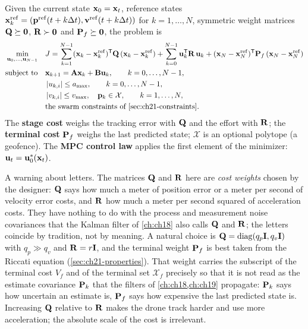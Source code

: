 \begin{definition}
\label{def:ch21-ocp}
Given the current state $\mathbf{x}_0=\mathbf{x}_t$, reference states
$\mathbf{x}_k^{\mathrm{ref}}=(\mathbf{p}^{\mathrm{ref}}(t+k\Delta t),\mathbf{v}^{\mathrm{ref}}(t+k\Delta t))$
for $k=1,\dots,N$, symmetric weight matrices $\mathbf{Q}\succeq\mathbf{0}$,
$\mathbf{R}\succ\mathbf{0}$ and $\mathbf{P}_f\succeq\mathbf{0}$, the problem is
\begin{equation}
\begin{aligned}
\min_{\ctrl_0,\dots,\ctrl_{N-1}}\quad & J=\sum_{k=1}^{N-1}(\state_k-\state_k^{\mathrm{ref}})\T\mat{Q}\,(\state_k-\state_k^{\mathrm{ref}})
+\sum_{k=0}^{N-1}\ctrl_k\T\mat{R}\,\ctrl_k
+(\state_N-\state_N^{\mathrm{ref}})\T\mat{P}_f\,(\state_N-\state_N^{\mathrm{ref}})\\
\st & \state_{k+1}=\mat{A}\state_k+\mat{B}\ctrl_k,\qquad k=0,\dots,N-1,\\
& \abs{u_{k,i}}\le a_{\max},\qquad k=0,\dots,N-1,\\
& \abs{v_{k,i}}\le v_{\max},\quad \pos_k\in\mathcal{X},\qquad k=1,\dots,N,\\
& \text{the swarm constraints of \cref{sec:ch21-constraints}.}
\end{aligned}
\label{eq:ch21-ocp}
\end{equation}
The \textbf{stage cost} weighs the tracking error with
$\mathbf{Q}$ and the effort with $\mathbf{R}$; the \textbf{terminal
cost} $\mathbf{P}_f$ weighs the last predicted state;
$\mathcal{X}$ is an optional polytope (a geofence). The \textbf{MPC control
law} applies the first element
of the minimizer: $\mathbf{u}_t=\mathbf{u}_0^{*}(\mathbf{x}_t)$.
\end{definition}

A warning about letters. The matrices $\mathbf{Q}$ and $\mathbf{R}$ here are
\emph{cost weights} chosen by the designer: $\mathbf{Q}$ says how much a meter
of position error or a meter per second of velocity error costs, and
$\mathbf{R}$ how much a meter per second squared of acceleration costs. They
have nothing to do with the process and measurement noise covariances that the
Kalman filter of \cref{ch:ch18} also calls $\mathbf{Q}$ and $\mathbf{R}$; the
letters coincide by tradition, not by meaning. A natural choice is
$\mathbf{Q}=\operatorname{diag}(q_p\mathbf{I},q_v\mathbf{I})$ with $q_p\gg q_v$ and
$\mathbf{R}=r\mathbf{I}$, and the terminal weight $\mathbf{P}_f$ is best taken from the
Riccati equation (\cref{sec:ch21-properties}). That weight carries the
subscript of the terminal cost $V_f$ and of the terminal set $\mathcal{X}_f$
precisely so that it is not read as the estimate covariance $\mathbf{P}_k$ that
the filters of \cref{ch:ch18,ch:ch19} propagate: $\mathbf{P}_k$ says how
uncertain an estimate is, $\mathbf{P}_f$ says how expensive the last predicted
state is. Increasing $\mathbf{Q}$ relative
to $\mathbf{R}$ makes the drone track harder and use more acceleration; the
absolute scale of the cost is irrelevant.

